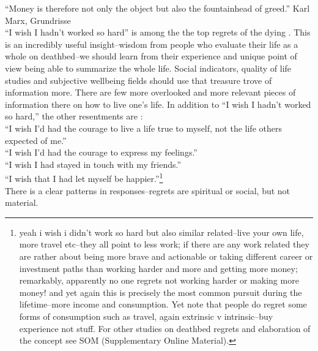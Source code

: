 \documentclass[10pt, letterpaper]{article}
\begin{document}
\begin{spacing}{1.8} %

\noindent``Money is therefore not only the object but also the fountainhead of greed.'' Karl Marx, Grundrisse\\



\noindent ``I wish I hadn't worked so hard'' is among the the top regrets of the dying \citep{ware12}.
 This is an incredibly useful insight--wisdom from people who evaluate their
life as a whole on deathbed--we should learn from their experience and unique
point of view being able to summarize the whole life. Social indicators,
quality of life studies and subjective wellbeing fields should use that treasure
trove of information more. There are few more overlooked and more relevant
pieces of information there on how to live one's life.  In addition to ``I wish
I hadn't worked so hard,'' the other resentments are \citep{ware12}:\\

\noindent ``I wish I'd had the courage to live a life true to myself, not the life others
expected of me.''\\
``I wish I'd had the courage to express my feelings.''\\
``I wish I had stayed in touch with my friends.''\\
``I wish that I had let myself be happier.''\footnote{yeah i wish i didn't work so
  hard but also similar related--live your own life, more travel etc--they all
  point to less work; if there are any work related they are rather about being
  more brave and actionable or taking different career or investment paths  than
  working harder and more and getting more money; remarkably, apparently no one
  regrets not working harder or making more money! and yet again this is
  precisely the most common pursuit during the lifetime--more income and
  consumption. Yet note that people do regret some forms of consumption such as
  travel, again extrinsic v intrinsic--buy experience not stuff. For other
  studies on deathbed regrets and elaboration of the concept see SOM
  (Supplementary Online Material).}\\

There is a clear patterns
in responses--regrets are spiritual or social, but not material.


\end{spacing}
\end{document}
